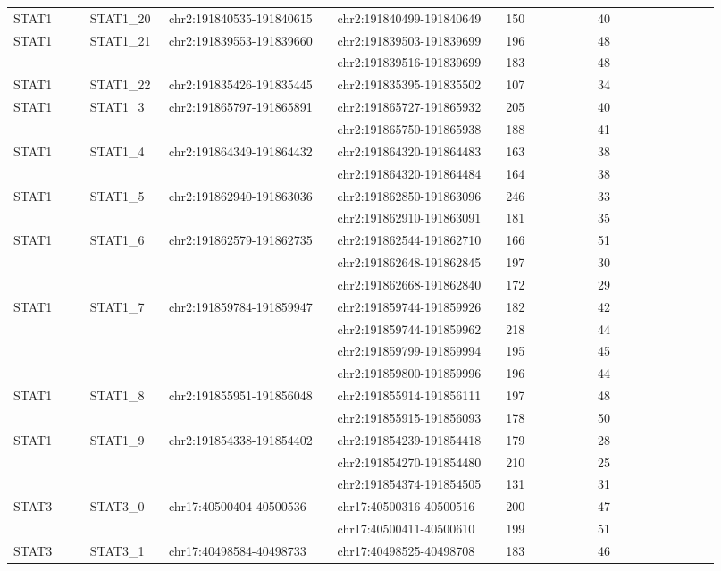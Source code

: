 \begin{landscape}
\begin{longtable}{p{0.1\linewidth}|p{0.1\linewidth}p{0.22\linewidth}p{0.22\linewidth}p{0.12\linewidth}p{0.16\linewidth}}
STAT1 & STAT1\_20 & chr2:191840535-191840615 & chr2:191840499-191840649 & 150 & 40
\\
STAT1 & STAT1\_21 & chr2:191839553-191839660 & chr2:191839503-191839699 & 196 & 48
\\
 & & & chr2:191839516-191839699 & 183 & 48
\\
STAT1 & STAT1\_22 & chr2:191835426-191835445 & chr2:191835395-191835502 & 107 & 34
\\
STAT1 & STAT1\_3 & chr2:191865797-191865891 & chr2:191865727-191865932 & 205 & 40
\\
 & & & chr2:191865750-191865938 & 188 & 41
\\
STAT1 & STAT1\_4 & chr2:191864349-191864432 & chr2:191864320-191864483 & 163 & 38
\\
 & & & chr2:191864320-191864484 & 164 & 38
\\
STAT1 & STAT1\_5 & chr2:191862940-191863036 & chr2:191862850-191863096 & 246 & 33
\\
 & & & chr2:191862910-191863091 & 181 & 35
\\
STAT1 & STAT1\_6 & chr2:191862579-191862735 & chr2:191862544-191862710 & 166 & 51
\\
 & & & chr2:191862648-191862845 & 197 & 30
\\
 & & & chr2:191862668-191862840 & 172 & 29
\\
STAT1 & STAT1\_7 & chr2:191859784-191859947 & chr2:191859744-191859926 & 182 & 42
\\
 & & & chr2:191859744-191859962 & 218 & 44
\\
 & & & chr2:191859799-191859994 & 195 & 45
\\
 & & & chr2:191859800-191859996 & 196 & 44
\\
STAT1 & STAT1\_8 & chr2:191855951-191856048 & chr2:191855914-191856111 & 197 & 48
\\
 & & & chr2:191855915-191856093 & 178 & 50
\\
STAT1 & STAT1\_9 & chr2:191854338-191854402 & chr2:191854239-191854418 & 179 & 28
\\
 & & & chr2:191854270-191854480 & 210 & 25
\\
 & & & chr2:191854374-191854505 & 131 & 31
\\
\hline
STAT3 & STAT3\_0 & chr17:40500404-40500536 & chr17:40500316-40500516 & 200 & 47
\\
 & & & chr17:40500411-40500610 & 199 & 51
\\
STAT3 & STAT3\_1 & chr17:40498584-40498733 & chr17:40498525-40498708 & 183 & 46
\\

\end{longtable}
\end{landscape}
